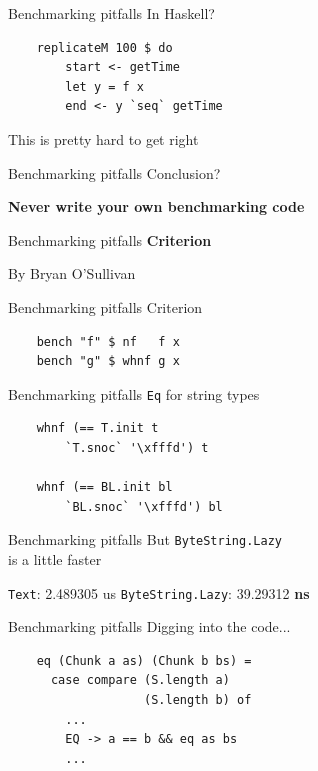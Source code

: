 \documentclass[20pt]{beamer}
\newcommand{\vspaced}{
    \vspace{5mm}
}
\begin{document}
\begin{frame}[fragile]{Benchmarking pitfalls}
    In Haskell?
    \vspaced
    \begin{lstlisting}
    replicateM 100 $ do
        start <- getTime
        let y = f x
        end <- y `seq` getTime
    \end{lstlisting}
    \vspaced
    This is pretty hard to get right
\end{frame}

\begin{frame}{Benchmarking pitfalls}
    Conclusion? \\
    \vspaced
    \textbf{Never write your own benchmarking code}
\end{frame}

\begin{frame}{Benchmarking pitfalls}
    \textbf{Criterion} \\
    \vspaced
    By Bryan O'Sullivan
\end{frame}

\begin{frame}[fragile]{Benchmarking pitfalls}
    Criterion \\
    \vspaced
    \begin{lstlisting}
    bench "f" $ nf   f x
    bench "g" $ whnf g x
    \end{lstlisting}
\end{frame}

\begin{frame}[fragile]{Benchmarking pitfalls}
    \texttt{Eq} for string types \\
    \vspaced
    \begin{lstlisting}
    whnf (== T.init t
        `T.snoc` '\xfffd') t

    whnf (== BL.init bl
        `BL.snoc` '\xfffd') bl
    \end{lstlisting}
\end{frame}

\begin{frame}{Benchmarking pitfalls}
    But \texttt{ByteString.Lazy} \\
    is a little faster \\
    \vspaced
    \texttt{Text}: 2.489305 us
    \texttt{ByteString.Lazy}: 39.29312 \textbf{ns}
\end{frame}

\begin{frame}[fragile]{Benchmarking pitfalls}
    Digging into the code... \\
    \vspaced
    \begin{lstlisting}
    eq (Chunk a as) (Chunk b bs) =
      case compare (S.length a)
                   (S.length b) of
        ...
        EQ -> a == b && eq as bs
        ...
    \end{lstlisting}
\end{frame}
\end{document}
